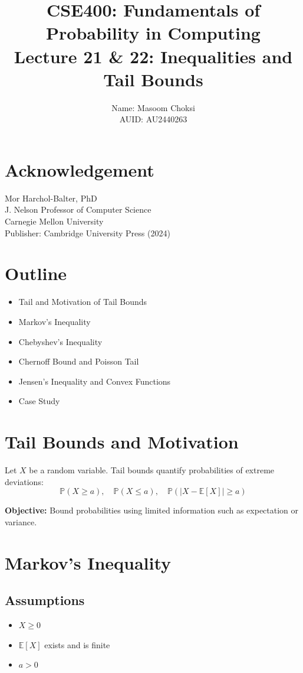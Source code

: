 \documentclass[12pt]{article}
\title{CSE400: Fundamentals of Probability in Computing \\ Lecture 21 \& 22: Inequalities and Tail Bounds}
\author{Name: Masoom Choksi \\ AUID: AU2440263}
\date{}
\begin{document}
\maketitle

\section*{Acknowledgement}
Mor Harchol-Balter, PhD \\
J. Nelson Professor of Computer Science \\
Carnegie Mellon University \\
Publisher: Cambridge University Press (2024)

\section*{Outline}
\begin{itemize}
    \item Tail and Motivation of Tail Bounds
    \item Markov’s Inequality
    \item Chebyshev’s Inequality
    \item Chernoff Bound and Poisson Tail
    \item Jensen’s Inequality and Convex Functions
    \item Case Study
\end{itemize}

\section{Tail Bounds and Motivation}

Let $X$ be a random variable. Tail bounds quantify probabilities of extreme deviations:
\[
\mathbb{P}(X \geq a), \quad \mathbb{P}(X \leq a), \quad \mathbb{P}(|X - \mathbb{E}[X]| \geq a)
\]

\textbf{Objective:} Bound probabilities using limited information such as expectation or variance.

\section{Markov’s Inequality}

\subsection{Assumptions}
\begin{itemize}
    \item $X \geq 0$
    \item $\mathbb{E}[X]$ exists and is finite
    \item $a > 0$
\end{itemize}
\end{document}
